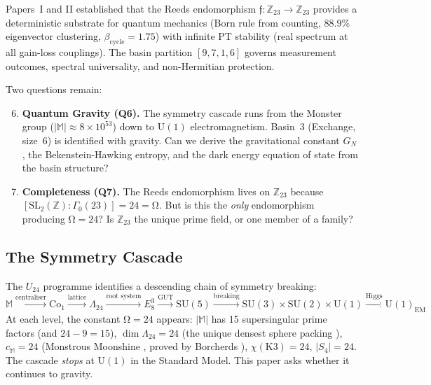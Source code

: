 \documentclass[12pt,a4paper]{article}
\theoremstyle{definition}\newtheorem{definition}[theorem]{Definition}
\theoremstyle{remark}\newtheorem{remark}[theorem]{Remark}
\renewcommand{\O}{\mathrm{\Omega}}
\newcommand{\Reeds}{\mathfrak{f}}\newcommand{\Zp}{\mathbb{Z}_{23}}
\newcommand{\Monster}{\mathbb{M}}\newcommand{\Leech}{\Lambda_{24}}
\begin{document}
Papers~I \cite{paper1} and II \cite{paper2} established that the Reeds
endomorphism $\Reeds: \Zp \to \Zp$ provides a deterministic substrate for
quantum mechanics (Born rule from counting, $88.9\%$ eigenvector clustering,
$\beta_{\mathrm{cycle}} = 1.75$) with infinite PT stability (real spectrum
at all gain-loss couplings). The basin partition $[9,7,1,6]$ governs
measurement outcomes, spectral universality, and non-Hermitian protection.

Two questions remain:
\begin{enumerate}[label=\textbf{Q\arabic*.}]
\setcounter{enumi}{5}
  \item \textbf{Quantum Gravity (Q6).} The symmetry cascade runs from the
  Monster group ($|\Monster| \approx 8 \times 10^{53}$) down to $\mathrm{U}(1)$
  electromagnetism. Basin~3 (Exchange, size~6) is identified with gravity. Can we
  derive the gravitational constant $G_N$, the Bekenstein-Hawking entropy, and
  the dark energy equation of state from the basin structure?

  \item \textbf{Completeness (Q7).} The Reeds endomorphism lives on $\Zp$ because
  $[\mathrm{SL}_2(\mathbb{Z}) : \Gamma_0(23)] = 24 = \O$. But is this the
  \emph{only} endomorphism producing $\O = 24$? Is $\Zp$ the unique prime field,
  or one member of a family?
\end{enumerate}

\subsection{The Symmetry Cascade}

The $U_{24}$ programme identifies a descending chain of symmetry breaking:
\begin{equation}
  \Monster \xrightarrow{\text{centraliser}} \mathrm{Co}_1
  \xrightarrow{\text{lattice}} \Leech
  \xrightarrow{\text{root system}} E_8^3
  \xrightarrow{\text{GUT}} \mathrm{SU}(5)
  \xrightarrow{\text{breaking}} \mathrm{SU}(3) \times \mathrm{SU}(2) \times \mathrm{U}(1)
  \xrightarrow{\text{Higgs}} \mathrm{U}(1)_{\mathrm{EM}}
\end{equation}
At each level, the constant $\O = 24$ appears: $|\Monster|$ has 15 supersingular
prime factors (and $24 - 9 = 15$), $\dim \Leech = 24$ (the unique densest sphere
packing \cite{viazovska2017}), $c_\Monster = 24$ (Monstrous Moonshine
\cite{conway_norton1979}, proved by Borcherds \cite{borcherds1992}),
$\chi(\mathrm{K3}) = 24$, $|S_4| = 24$. The cascade \emph{stops} at
$\mathrm{U}(1)$ in the Standard Model. This paper asks whether it continues to
gravity.
\end{document}
